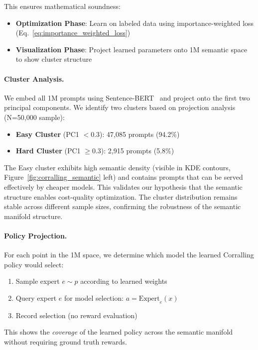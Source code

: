This ensures mathematical soundness:
\begin{itemize}[nosep]
    \item \textbf{Optimization Phase}: Learn on labeled data using importance-weighted loss (Eq.~\ref{eq:importance_weighted_loss})
    \item \textbf{Visualization Phase}: Project learned parameters onto 1M semantic space to show cluster structure
\end{itemize}

\paragraph{Cluster Analysis.}
We embed all 1M prompts using Sentence-BERT~\cite{reimers2019sentence} and project onto the first two principal components.
We identify two clusters based on projection analysis (N=50,000 sample):
\begin{itemize}[nosep]
    \item \textbf{Easy Cluster} (PC1 $< 0.3$): 47,085 prompts (94.2\%)
    \item \textbf{Hard Cluster} (PC1 $\geq 0.3$): 2,915 prompts (5.8\%)
\end{itemize}

The Easy cluster exhibits high semantic density (visible in KDE contours, Figure~\ref{fig:corralling_semantic} left) and contains prompts that can be served effectively by cheaper models.
This validates our hypothesis that the semantic structure enables cost-quality optimization.
The cluster distribution remains stable across different sample sizes, confirming the robustness of the semantic manifold structure.

\paragraph{Policy Projection.}
For each point in the 1M space, we determine which model the learned Corralling policy would select:
\begin{enumerate}[nosep]
    \item Sample expert $e \sim p$ according to learned weights
    \item Query expert $e$ for model selection: $a = \text{Expert}_e(x)$
    \item Record selection (no reward evaluation)
\end{enumerate}

This shows the \emph{coverage} of the learned policy across the semantic manifold without requiring ground truth rewards.


